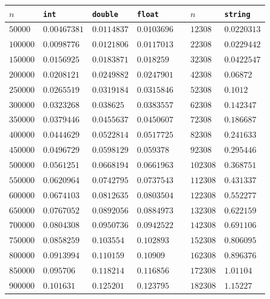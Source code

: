 \documentclass[12pt]{article}
\begin{document}
    \begin{table}
        \centering
        \begin{tabular}{|l|l|l|l||l||l|l|}
             \hline
            $n$ & \verb|int| & \verb|double| & \verb|float| &\qquad\qquad& $n$ & \verb|string| \\
             \hline
             $50000$   & $0.00467381$ & $0.0114837$ & $0.0103696$ && $12308$  & $0.0220313$ \\
            $100000$  & $0.0098776 $ & $0.0121806$ & $0.0117013$ && $22308$  & $0.0229442$ \\
            $150000$  & $0.0156925 $ & $0.0183871$ & $0.018259$ && $32308$  & $0.0422547$ \\
            $200000$  & $0.0208121 $ & $0.0249882$ & $0.0247901$ && $42308$  & $0.06872$ \\
            $250000$  & $0.0265519 $ & $0.0319184$ & $0.0315846$ && $52308$  & $0.1012$ \\
            $300000$  & $0.0323268 $ & $0.038625 $ & $0.0383557$ && $62308$  & $0.142347$ \\
            $350000$  & $0.0379446 $ & $0.0455637$ & $0.0450607$ && $72308$  & $0.186687$ \\
            $400000$  & $0.0444629 $ & $0.0522814$ & $0.0517725$ && $82308$  & $0.241633$ \\
            $450000$  & $0.0496729 $ & $0.0598129$ & $0.059378$ && $92308$  & $0.295446$ \\
            $500000$  & $0.0561251 $ & $0.0668194$ & $0.0661963$ && $102308$ & $0.368751$ \\
            $550000$  & $0.0620964$  & $0.0742795$ & $0.0737543$ && $112308$ & $0.431337$ \\
            $600000$  & $0.0674103$  & $0.0812635$ & $0.0803504$ && $122308$ & $0.552277$ \\
            $650000$  & $0.0767052$  & $0.0892056$ & $0.0884973$ && $132308$ & $0.622159$ \\
            $700000$  & $0.0804308$  & $0.0950736$ & $0.0942522$ && $142308$ & $0.691106$ \\
            $750000$  & $0.0858259$  & $0.103554 $ & $0.102893$ && $152308$ & $0.806095$ \\
            $800000$  & $0.0913994$  & $0.110159 $ & $0.10909$ && $162308$ & $0.896376$ \\
            $850000$  & $0.095706 $  & $0.118214 $ & $0.116856$ && $172308$ & $1.01104$ \\
            $900000$  & $0.101631 $  & $0.125201 $ & $0.123795$ && $182308$ & $1.15227$ \\

\end{tabular}
\end{table}
\end{document}
